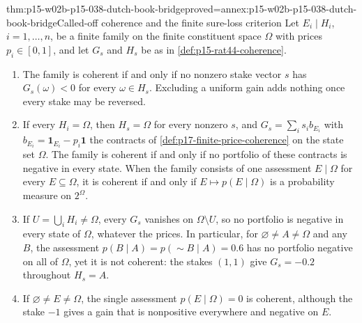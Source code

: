 \begin{hbtheorem}{thm:p15-w02b-p15-038-dutch-book-bridge}{proved=annex:p15-w02b-p15-038-dutch-book-bridge}{Called-off coherence and the finite sure-loss criterion}
Let \(E_i\mid H_i\), \(i=1,\ldots,n\), be a finite family on the finite
constituent space \(\Omega\) with prices \(p_i\in[0,1]\), and let
\(G_s\) and \(H_s\) be as in \cref{def:p15-rat44-coherence}.
\begin{enumerate}
\item The family is coherent if and only if no nonzero stake vector
      \(s\) has \(G_s(\omega)<0\) for every \(\omega\in H_s\).
      Excluding a uniform gain adds nothing once every stake may be
      reversed.
\item If every \(H_i=\Omega\), then \(H_s=\Omega\) for every nonzero
      \(s\), and \(G_s=\sum_is_ib_{E_i}\) with
      \(b_{E_i}=\mathbf1_{E_i}-p_i\mathbf1\) the contracts of
      \cref{def:p17-finite-price-coherence} on the state set
      \(\Omega\). The family is coherent if and only if no portfolio
      of these contracts is negative in every state. When the family
      consists of one assessment \(E\mid\Omega\) for every
      \(E\subseteq\Omega\), it is coherent if and only if \(E\mapsto
      p(E\mid\Omega)\) is a probability measure on \(2^\Omega\).
\item If \(U=\bigcup_iH_i\ne\Omega\), every \(G_s\) vanishes on
      \(\Omega\setminus U\), so no portfolio is negative in every
      state of \(\Omega\), whatever the prices. In particular, for
      \(\varnothing\ne A\ne\Omega\) and any \(B\), the assessment
      \(p(B\mid A)=p(\sim B\mid A)=0.6\) has no portfolio negative on
      all of \(\Omega\), yet it is not coherent: the stakes \((1,1)\)
      give \(G_s=-0.2\) throughout \(H_s=A\).
\item If \(\varnothing\ne E\ne\Omega\), the single assessment
      \(p(E\mid\Omega)=0\) is coherent, although the stake \(-1\)
      gives a gain that is nonpositive everywhere and negative on
      \(E\).
\end{enumerate}
\end{hbtheorem}

